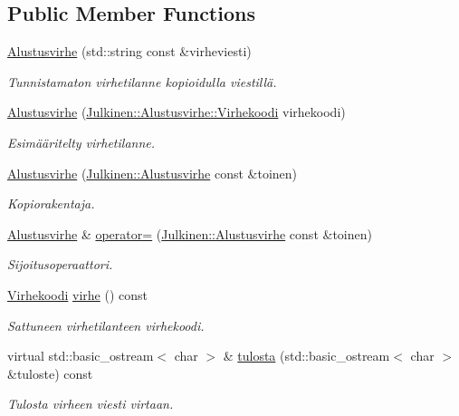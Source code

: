 \subsection*{Public Member Functions}
\begin{DoxyCompactItemize}
\item 
\hyperlink{class_julkinen_1_1_alustusvirhe_aab6d2164d8c55d404febff382556a8fd}{Alustusvirhe} (std\+::string const \&virheviesti)
\begin{DoxyCompactList}\small\item\em Tunnistamaton virhetilanne kopioidulla viestillä. \end{DoxyCompactList}\item 
\hyperlink{class_julkinen_1_1_alustusvirhe_a46f9b253c9ce0336c12bad1d2f3a93a1}{Alustusvirhe} (\hyperlink{class_julkinen_1_1_alustusvirhe_a6c27ff51ee369cf37028b8a7ea0eafc0}{Julkinen\+::\+Alustusvirhe\+::\+Virhekoodi} virhekoodi)
\begin{DoxyCompactList}\small\item\em Esimääritelty virhetilanne. \end{DoxyCompactList}\item 
\hyperlink{class_julkinen_1_1_alustusvirhe_a03dbadc97b43077338d874c899c9da1d}{Alustusvirhe} (\hyperlink{class_julkinen_1_1_alustusvirhe}{Julkinen\+::\+Alustusvirhe} const \&toinen)
\begin{DoxyCompactList}\small\item\em Kopiorakentaja. \end{DoxyCompactList}\item 
\hyperlink{class_julkinen_1_1_alustusvirhe}{Alustusvirhe} \& \hyperlink{class_julkinen_1_1_alustusvirhe_a520656e118da9c9e7baf1baeeacb972e}{operator=} (\hyperlink{class_julkinen_1_1_alustusvirhe}{Julkinen\+::\+Alustusvirhe} const \&toinen)
\begin{DoxyCompactList}\small\item\em Sijoitusoperaattori. \end{DoxyCompactList}\item 
\hypertarget{class_julkinen_1_1_alustusvirhe_af9a610132f2dccefe4b3ba2bf241cd2d}{}\hyperlink{class_julkinen_1_1_alustusvirhe_a6c27ff51ee369cf37028b8a7ea0eafc0}{Virhekoodi} \hyperlink{class_julkinen_1_1_alustusvirhe_af9a610132f2dccefe4b3ba2bf241cd2d}{virhe} () const \label{class_julkinen_1_1_alustusvirhe_af9a610132f2dccefe4b3ba2bf241cd2d}

\begin{DoxyCompactList}\small\item\em Sattuneen virhetilanteen virhekoodi. \end{DoxyCompactList}\item 
virtual std\+::basic\+\_\+ostream$<$ char $>$ \& \hyperlink{class_julkinen_1_1_alustusvirhe_a22b50252a516b339d126261978fb62c1}{tulosta} (std\+::basic\+\_\+ostream$<$ char $>$ \&tuloste) const 
\begin{DoxyCompactList}\small\item\em Tulosta virheen viesti virtaan. \end{DoxyCompactList}\end{DoxyCompactItemize}

